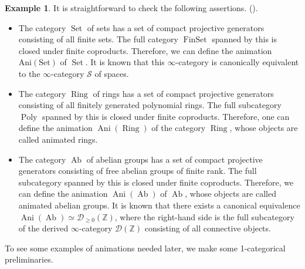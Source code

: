 \documentclass[11pt, a4paper]{amsart}
\theoremstyle{plain}
\theoremstyle{definition}
\newtheorem{example}[theorem]{Example}
\begin{document}
\begin{example}\label{exa3.5}
It is straightforward to check the following assertions. (\cite[Example 5.1.3]{CS24}).
    \begin{itemize}
        \item The category $\operatorname{Set}$ of sets has a set of compact projective generators consisting of all finite sets. The full category $\operatorname{FinSet}$ spanned by this is closed under finite coproducts. Therefore, we can define the animation $\operatorname{Ani(Set)}$ of $\operatorname{Set}$. It is known that this $\infty$-category is canonically equivalent to the $\infty$-category $\mathcal S$ of spaces.
        \item The category $\operatorname{Ring}$ of rings has a set of compact projective generators consisting of all finitely generated polynomial rings. The full subcategory $\operatorname{Poly}$ spanned by this is closed under finite coproducts. Therefore, one can define the animation $\operatorname{Ani}(\operatorname{Ring})$ of the category $\operatorname{Ring}$, whose objects are called animated rings.
        \item The category $\operatorname{Ab}$ of abelian groups has a set of compact projective generators consisting of free abelian groups of finite rank. The full subcategory spanned by this is closed under finite coproducts. Therefore, we can define the animation $\operatorname{Ani}(\operatorname{Ab})$ of $\operatorname{Ab}$, whose objects are called animated abelian groups. It is known that there exists a canonical equivalence $\operatorname{Ani}(\operatorname{Ab})\simeq \mathcal D_{\ge 0}(\mathbb Z)$, where the right-hand side is the full subcategory of the derived $\infty$-category $\mathcal D(\mathbb Z)$ consisting of all connective objects.
    \end{itemize}
\end{example}
To see some examples of animations needed later, we make some 1-categorical preliminaries.  
\end{document}
